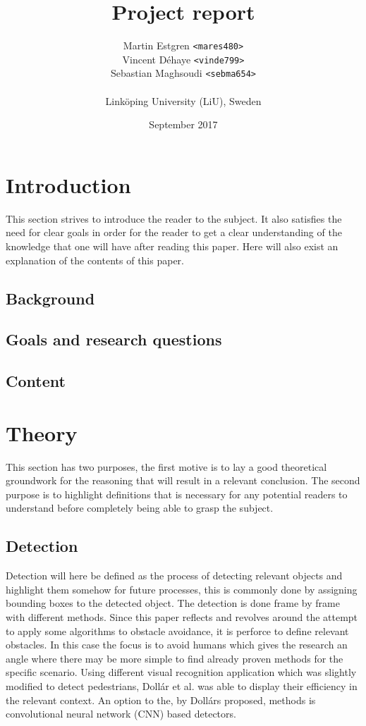 \documentclass[twocolumn]{article}
\title{Project report}
\author{{Martin Estgren \texttt{<mares480>}} \\
        {{Vincent Déhaye \texttt{<vinde799>}} \\
        {Sebastian Maghsoudi \texttt{<sebma654>}} \\~\\
        {Linköping University (LiU), Sweden}}}
\date{September 2017}
\begin{document}
\maketitle

\tableofcontents

\newpage

\section{Introduction}
 This section strives to introduce the reader to the subject. It also satisfies the need for clear goals in order for the reader to get a clear understanding of the knowledge that one will have after reading this paper. Here will also exist an explanation of the contents of this paper.
\subsection{Background}
\subsection{Goals and research questions}
\subsection{Content}

\section{Theory}
 This section has two purposes, the first motive is to lay a good theoretical groundwork for the reasoning that will result in a relevant conclusion. The second purpose is to highlight definitions that is necessary for any potential readers to understand before completely being able to grasp the subject. 

\subsection{Detection}
 Detection will here be defined as the process of detecting relevant objects and highlight them somehow for future processes, this is commonly done by assigning bounding boxes to the detected object. The detection is done frame by frame with different methods. Since this paper reflects and revolves around the attempt to apply some algorithms to obstacle avoidance, it is perforce to define relevant obstacles. In this case the focus is to avoid humans which gives the research an angle where there may be more simple to find already proven methods for the specific scenario. Using different visual recognition application which was slightly modified to detect pedestrians, Dollár et al.\cite{dollar2014fast}
 was able to display their efficiency in the relevant context. An option to the, by Dollárs\cite{dollar2014fast} proposed, methods is convolutional neural network (CNN) based detectors.       
\end{document}
